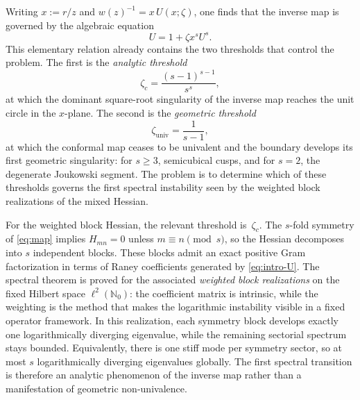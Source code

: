 \documentclass[11pt]{amsart}
\numberwithin{equation}{section}
\theoremstyle{plain}
\theoremstyle{definition}
\theoremstyle{remark}
\newcommand{\NN}{\mathbb{N}}
\begin{document}
Writing $x:=r/z$ and $w(z)^{-1}=x\,U(x;\zeta)$,
one finds that the inverse map is governed by the algebraic equation
\begin{equation}\label{eq:intro-U}
	U=1+\zeta x^sU^s.
\end{equation}
This elementary relation already contains the two thresholds that control the
problem. The first is the \emph{analytic threshold}
\[
	\zeta_c=\frac{(s-1)^{s-1}}{s^s},
\]
at which the dominant square-root singularity of the inverse map reaches
the unit circle in the \(x\)-plane. The second is the \emph{geometric threshold}
\[
	\zeta_{\mathrm{univ}}=\frac{1}{s-1},
\]
at which the conformal map ceases to be univalent and the boundary develops
its first geometric singularity: for \(s\ge3\), semicubical cusps, and for
\(s=2\), the degenerate Joukowski segment. The problem is to determine which
of these thresholds governs the first spectral instability seen by the
weighted block realizations of the mixed Hessian.

For the weighted block Hessian, the relevant threshold is~\(\zeta_c\). The \(s\)-fold
symmetry of \eqref{eq:map} implies \(H_{mn}=0\) unless
\(m\equiv n\pmod s\), so the Hessian decomposes into \(s\) independent
blocks. These blocks admit an exact positive Gram factorization in terms of
Raney coefficients generated by \eqref{eq:intro-U}. The spectral theorem is
proved for the associated \emph{weighted block realizations} on the fixed
Hilbert space \(\ell^2(\NN_0)\): the coefficient matrix is intrinsic, while
the weighting is the method that makes the logarithmic instability visible in
a fixed operator framework. In this realization, each symmetry block develops
exactly one logarithmically diverging eigenvalue, while the remaining
sectorial spectrum stays bounded. Equivalently, there is one stiff mode per
symmetry sector, so at most \(s\) logarithmically diverging eigenvalues
globally. The first spectral transition is therefore an analytic phenomenon
of the inverse map rather than a manifestation of geometric
non-univalence.
\end{document}
